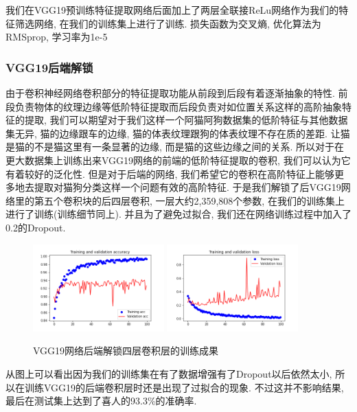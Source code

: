 \documentclass[lang=cn,11pt]{elegantpaper}
\begin{document}
我们在VGG19预训练特征提取网络后面加上了两层全联接ReLu网络作为我们的特征筛选网络, 在我们的训练集上进行了训练. 损失函数为交叉熵, 优化算法为RMSprop, 学习率为1e-5

\subsubsection{VGG19后端解锁}

由于卷积神经网络卷积部分的特征提取功能从前段到后段有着逐渐抽象的特性. 前段负责物体的纹理边缘等低阶特征提取而后段负责对如位置关系这样的高阶抽象特征的提取, 我们可以期望对于我们这样一个阿猫阿狗数据集的低阶特征与其他数据集无异, 猫的边缘跟车的边缘, 猫的体表纹理跟狗的体表纹理不存在质的差距. 让猫是猫的不是猫这里有一条显著的边缘, 而是猫的这些边缘之间的关系. 所以对于在更大数据集上训练出来VGG19网络的前端的低阶特征提取的卷积, 我们可以认为它有着较好的泛化性. 但是对于后端的网络, 我们希望它的卷积在高阶特征上能够更多地去提取对猫狗分类这样一个问题有效的高阶特征. 于是我们解锁了后VGG19网络里的第五个卷积块的后四层卷积, 一层大约2,359,808个参数, 在我们的训练集上进行了训练(训练细节同上). 并且为了避免过拟合, 我们还在网络训练过程中加入了0.2的Dropout.


\begin{figure}[hbt]
\centering
  \includegraphics[width=0.45\textwidth]{VGG_19_unlocked_1}
  \includegraphics[width=0.45\textwidth]{VGG_19_unlocked_2}
  \caption{VGG19网络后端解锁四层卷积层的训练成果}
\end{figure}

从图上可以看出因为我们的训练集在有了数据增强有了Dropout以后依然太小, 所以在训练VGG19的后端卷积层时还是出现了过拟合的现象. 不过这并不影响结果, 最后在测试集上达到了喜人的93.3\%的准确率.
\end{document}
